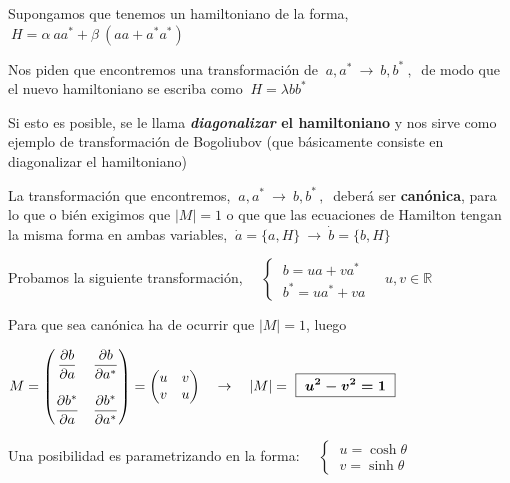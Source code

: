 \begin{example}

\vspace{2mm} Supongamos que tenemos un hamiltoniano de la forma, $\ H=\alpha \ a a^* + \beta \ (aa+a^*a^*)\ $	

\vspace{2mm} Nos piden que encontremos una transformación de $ \ a,a^* \ \to \ b,b^*\ , \ $ de modo que el nuevo hamiltoniano se escriba como $\ H=\lambda b b^*$

\vspace{2mm} Si esto es posible, se le llama \textbf{\emph{diagonalizar} el hamiltoniano} y nos sirve como ejemplo de transformación de Bogoliubov (que básicamente consiste en diagonalizar el hamiltoniano)

\vspace{2mm} La transformación que encontremos, $ \ a,a^* \ \to \ b,b^*\, , \  $ deberá ser \textbf{canónica}, para lo que o bién exigimos que $|M|=1$ o que que las ecuaciones de Hamilton tengan la misma forma en ambas variables, $\ \dot a =\{a,H\} \ \to \ \dot b=\{b,H\} \ $
\end{example}

Probamos la siguiente transformación, $\quad \begin{cases} 
 \ b=ua+va^* \\ \ b^*=ua^*+va	
 \end{cases} \quad u,v\in \mathbb R$


Para que sea canónica ha de ocurrir que $|M|=1$, luego

$\displaystyle M=\mqty( \displaystyle \pdv {b}{a} & \displaystyle \pdv {b}{a^*} \\ \\ \displaystyle \pdv {b^*}{a} & \displaystyle \pdv {b^*}{a^*} )= \mqty(u&v\\v&u) \quad \to \quad |M|=\ \boxed{ \ \boldsymbol{u^2-v^2 = 1} \ }$

Una posibilidad es parametrizando en la forma: $\quad \begin{cases} \ u= \cosh \theta \\ \ v=\sinh \theta \end{cases}$
 

